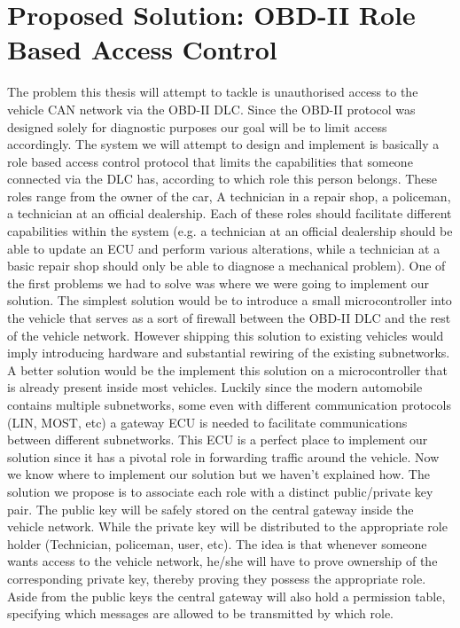\documentclass[11pt]{article}
\begin{document}
\section{Proposed Solution: OBD-II Role Based Access Control}
The problem this thesis will attempt to tackle is unauthorised access to the vehicle CAN network via the OBD-II DLC. Since the OBD-II protocol was designed solely for diagnostic purposes our goal will be to limit access accordingly. The system we will attempt to design and implement is basically a role based access control protocol that limits the capabilities that someone connected via the DLC has, according to which role this person belongs. These roles range from the owner of the car, A technician in a repair shop, a policeman, a technician at an official dealership. Each of these roles should facilitate different capabilities within the system (e.g. a technician at an official dealership should be able to update an ECU and perform various alterations, while a technician at a basic repair shop should only be able to diagnose a mechanical problem). \newline
\newline
One of the first problems we had to solve was where we were going to implement our solution. The simplest solution would be to introduce a small microcontroller into the vehicle that serves as a sort of firewall between the OBD-II DLC and the rest of the vehicle network. However shipping this solution to existing vehicles would imply introducing hardware and substantial rewiring of the existing subnetworks. A better solution would be the implement this solution on a microcontroller that is already present inside most vehicles. Luckily since the modern automobile contains multiple subnetworks, some even with different communication protocols (LIN, MOST, etc) a gateway ECU is needed to facilitate communications between different subnetworks. This ECU is a perfect place to implement our solution since it has a pivotal role in forwarding traffic around the vehicle.\newline
\newline
Now we know where to implement our solution but we haven't explained how. The solution we propose is to associate each role with a distinct public/private key pair. The public key will be safely stored on the central gateway inside the vehicle network. While the private key will be distributed to the appropriate role holder (Technician, policeman, user, etc). The idea is that whenever someone wants access to the vehicle network, he/she will have to prove ownership of the corresponding private key, thereby proving they possess the appropriate role. Aside from the public keys the central gateway will also hold a permission table, specifying which messages are allowed to be transmitted by which role.
\end{document}
